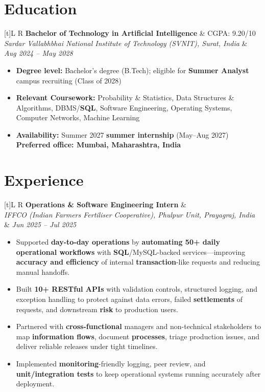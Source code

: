 \documentclass[a4paper,10pt]{article}
\newcommand{\resumeSubheading}[4]{%
  \vspace{0.5mm}
  \noindent
  \begin{tabularx}{\textwidth}[t]{L R}
    \textbf{#1} & #4 \\
    \textit{#3} & \textit{#2} \\
  \end{tabularx}
  \vspace{-0.5mm}%
}
\begin{document}
\section{Education}
\small
\resumeSubheading
  {Bachelor of Technology in Artificial Intelligence}{Aug 2024 -- May 2028}
  {Sardar Vallabhbhai National Institute of Technology (SVNIT), Surat, India}{CGPA: 9.20/10}
\begin{itemize}
  \item \textbf{Degree level:} Bachelor's degree (B.Tech); eligible for \textbf{Summer Analyst} campus recruiting (Class of 2028)
  \item \textbf{Relevant Coursework:} Probability \& Statistics, Data Structures \& Algorithms, DBMS/\textbf{SQL}, Software Engineering, Operating Systems, Computer Networks, Machine Learning
  \item \textbf{Availability:} Summer 2027 \textbf{summer internship} (May--Aug 2027) \textbar{} \textbf{Preferred office: Mumbai, Maharashtra, India}
\end{itemize}

\section{Experience}
\small
\resumeSubheading
  {Operations \& Software Engineering Intern}{Jun 2025 -- Jul 2025}
  {IFFCO (Indian Farmers Fertiliser Cooperative), Phulpur Unit, Prayagraj, India}{}
\begin{itemize}
  \item Supported \textbf{day-to-day operations} by \textbf{automating 50+ daily operational workflows} with \textbf{SQL}/MySQL-backed services---improving \textbf{accuracy and efficiency} of internal \textbf{transaction}-like requests and reducing manual handoffs.
  \item Built \textbf{10+ RESTful APIs} with validation controls, structured logging, and exception handling to protect against data errors, failed \textbf{settlements} of requests, and downstream \textbf{risk} to production users.
  \item Partnered with \textbf{cross-functional} managers and non-technical stakeholders to map \textbf{information flows}, document \textbf{processes}, triage production issues, and deliver reliable releases under tight timelines.
  \item Implemented \textbf{monitoring}-friendly logging, peer review, and \textbf{unit/integration tests} to keep operational systems running accurately after deployment.
\end{itemize}
\end{document}

